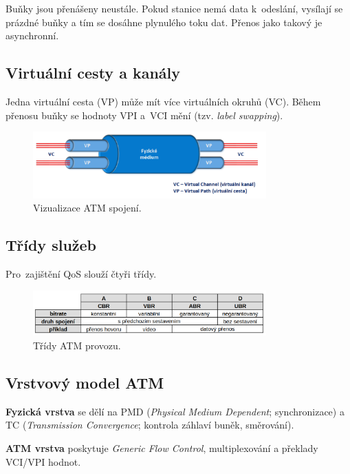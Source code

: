 Buňky jsou přenášeny neustále.
Pokud stanice nemá data k~odeslání, vysílají se prázdné buňky a tím se dosáhne plynulého toku dat.
Přenos jako takový je asynchronní.


\subsection{Virtuální cesty a kanály}

Jedna virtuální cesta (VP) může mít více virtuálních okruhů (VC).
Během přenosu buňky se hodnoty VPI a~VCI mění (tzv. \emph{label swapping}).

\begin{figure}[ht]
    \centering
    \includegraphics[width=0.8\textwidth]{snimky/VC.png}
    \caption{Vizualizace ATM spojení.}
    \label{fig:virt-cesty-kanaly}
\end{figure}
\FloatBarrier


\subsection{Třídy služeb}

Pro~zajištění QoS slouží čtyři třídy.

\begin{figure}[ht]
    \centering
    \includegraphics[width=0.8\textwidth]{snimky/atm-tridy}
    \caption{Třídy ATM provozu.}
\end{figure}
\FloatBarrier


\subsection{Vrstvový model ATM}

\textbf{Fyzická vrstva} se dělí na PMD (\emph{Physical Medium Dependent}; synchronizace) a TC (\emph{Transmission Convergence}; kontrola záhlaví buněk, směrování).

\textbf{ATM vrstva} poskytuje \emph{Generic Flow Control}, multiplexování a překlady VCI/VPI hodnot.

